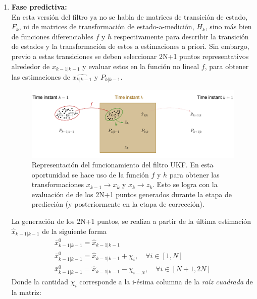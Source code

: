 \begin{enumerate}
\item \textbf{Fase predictiva:}\\
En esta versi\'on del filtro ya no se habla de matrices de transici\'on de estado, $F_k$, ni de matrices de transformaci\'on de estado-a-medici\'on, $H_k$, sino m\'as bien de funciones diferenciables $f$ y $h$ respectivamente para describir la transici\'on de estados  y la transformaci\'on de estos a estimaciones a priori. Sin embargo, previo a estas transiciones se deben seleccionar 2N+1 puntos representativos alrededor de $\hat{x}_{k-1|k-1}$ y evaluar estos en la funci\'on no lineal $f$, para obtener las estimaciones de $\hat{x_{k|k-1}}$ y $P_{k|k-1}$.

\begin{figure}
\includegraphics[scale=.5]{images/ukf}
\caption{Representaci\'on del funcionamiento del filtro UKF. En esta oportunidad se hace uso de la funci\'on $f$ y $h$ para obtener las transformaciones $x_{k-1}\rightarrow x_k$ y $x_{k}\rightarrow z_k$. Esto se logra con la evaluaci\'on de de los 2N+1 puntos generados durante la etapa de predicci\'on (y posteriormente en la etapa de correcci\'on).} 
\end{figure}

La generaci\'on de los 2N+1 puntos, se realiza a partir de la \'ultima estimaci\'on $\hat{x}_{k-1|k-1}$  de la siguiente forma
\begin{equation}
\label{eq:eq18}
\begin{gathered}
\bar{x}_{k-1| k-1}^0 = \hat{x}_{k-1|k-1}\\
\bar{x}_{k-1| k-1}^0 = \hat{x}_{k-1|k-1}+ \chi_i, \quad  \forall i \in [1, N]\\
\bar{x}_{k-1| k-1}^0 = \hat{x}_{k-1|k-1}- \chi_{i-N}, \quad  \forall i \in [N+1, 2N]
\end{gathered}
\end{equation}
Donde la cantidad $\chi_i$ corresponde a la i-\'esima columna de la \textit{ra\'iz cuadrada} de la matriz:


\end{enumerate}

